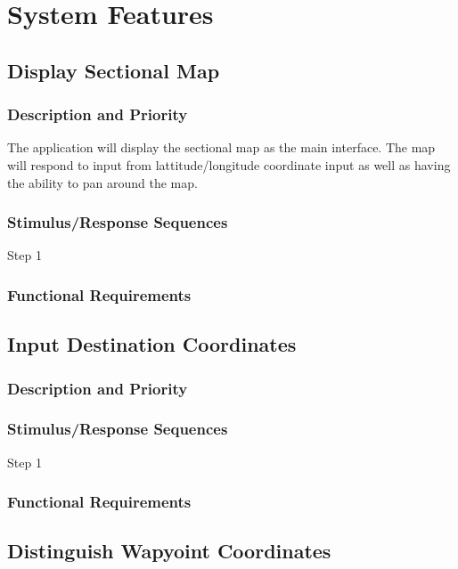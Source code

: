 \documentclass[12pt, letterpaper]{article}
\begin{document}
\section{System Features}
  \subsection{Display Sectional Map}
    \subsubsection{Description and Priority}
      The application will display the sectional map as the main interface.
      The map will respond to input from lattitude/longitude coordinate input as well
      as having the ability to pan around the map.
    \subsubsection{Stimulus/Response Sequences}
      \begin{description}
        \item[Step 1]
      \end{description}
    \subsubsection{Functional Requirements}

  \subsection{Input Destination Coordinates}
    \subsubsection{Description and Priority}
    \subsubsection{Stimulus/Response Sequences}
      \begin{description}
        \item[Step 1]
      \end{description}
    \subsubsection{Functional Requirements}

    \subsection{Distinguish Wapyoint Coordinates}
\end{document}
